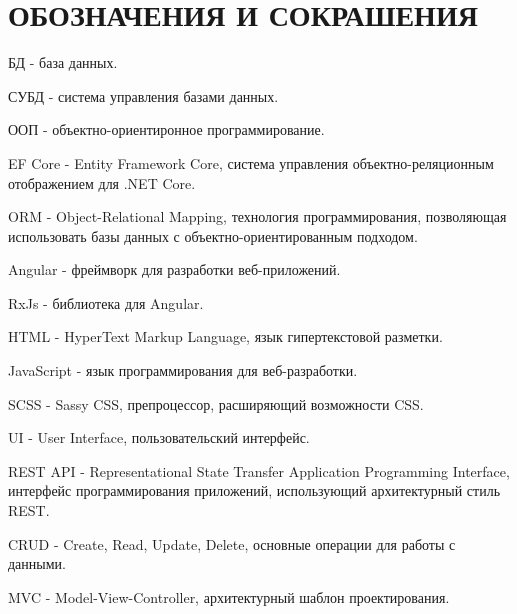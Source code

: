 \section*{ОБОЗНАЧЕНИЯ И СОКРАШЕНИЯ}

БД -\- база данных.

СУБД -\- система управления базами данных.

ООП -\- объектно-ориентиронное программирование.

EF Core -\- Entity Framework Core, система управления объектно-реляционным отображением для .NET Core.

ORM -\- Object-Relational Mapping, технология программирования, позволяющая использовать базы данных с объектно-ориентированным подходом.

Angular -\- фреймворк для разработки веб-приложений.

RxJs -\- библиотека для Angular.

HTML -\- HyperText Markup Language, язык гипертекстовой разметки.

JavaScript -\- язык программирования для веб-разработки.

SCSS -\- Sassy CSS, препроцессор, расширяющий возможности CSS.

UI -\- User Interface, пользовательский интерфейс.

REST API -\- Representational State Transfer Application Programming Interface, интерфейс программирования приложений, использующий архитектурный стиль REST.

CRUD -\- Create, Read, Update, Delete, основные операции для работы с данными.

MVC -\- Model-View-Controller, архитектурный шаблон проектирования.